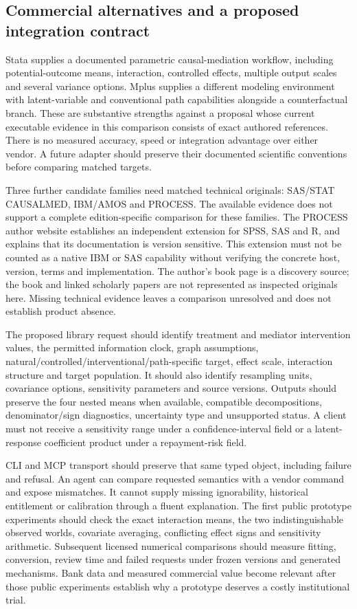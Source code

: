 \subsection{Commercial alternatives and a proposed integration contract}
\label{exec20:med-integration}
Stata supplies a documented parametric causal-mediation workflow, including potential-outcome means, interaction, controlled effects, multiple output scales and several variance options. Mplus supplies a different modeling environment with latent-variable and conventional path capabilities alongside a counterfactual branch. These are substantive strengths against a proposal whose current executable evidence in this comparison consists of exact authored references. There is no measured accuracy, speed or integration advantage over either vendor. A future adapter should preserve their documented scientific conventions before comparing matched targets.

Three further candidate families need matched technical originals: SAS/STAT CAUSALMED, IBM/AMOS and PROCESS. The available evidence does not support a complete edition-specific comparison for these families. The PROCESS author website establishes an independent extension for SPSS, SAS and R, and explains that its documentation is version sensitive. This extension must not be counted as a native IBM or SAS capability without verifying the concrete host, version, terms and implementation. The author's book page is a discovery source; the book and linked scholarly papers are not represented as inspected originals here. Missing technical evidence leaves a comparison unresolved and does not establish product absence.~\citep{exec20_med_process_lead}

The proposed library request should identify treatment and mediator intervention values, the permitted information clock, graph assumptions, natural/controlled/interventional/path-specific target, effect scale, interaction structure and target population. It should also identify resampling units, covariance options, sensitivity parameters and source versions. Outputs should preserve the four nested means when available, compatible decompositions, denominator/sign diagnostics, uncertainty type and unsupported status. A client must not receive a sensitivity range under a confidence-interval field or a latent-response coefficient product under a repayment-risk field.

CLI and MCP transport should preserve that same typed object, including failure and refusal. An agent can compare requested semantics with a vendor command and expose mismatches. It cannot supply missing ignorability, historical entitlement or calibration through a fluent explanation. The first public prototype experiments should check the exact interaction means, the two indistinguishable observed worlds, covariate averaging, conflicting effect signs and sensitivity arithmetic. Subsequent licensed numerical comparisons should measure fitting, conversion, review time and failed requests under frozen versions and generated mechanisms. Bank data and measured commercial value become relevant after those public experiments establish why a prototype deserves a costly institutional trial.
